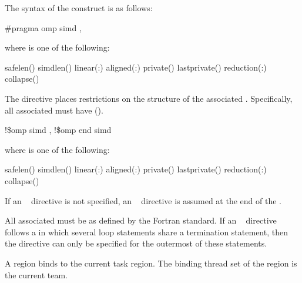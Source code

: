 \syntax
The syntax of the  construct is as follows:

\ccppspecificstart
\begin{boxedcode}
\#pragma omp simd \plc{[clause[ [},\plc{] clause] ... ] new-line}
\end{boxedcode}

where  is one of the following:

\begin{indentedcodelist}
safelen()
simdlen()
linear(\plc{list[ }:\plc{ linear-step]})
aligned(\plc{list[ }:\plc{ alignment]})
private()
lastprivate()
reduction(:)
collapse()
\end{indentedcodelist}

The  directive places restrictions on the structure of the associated . 
Specifically, all associated  must have  
().
\ccppspecificend

\fortranspecificstart
\begin{boxedcode}
!\$omp simd \plc{[clause[ [},\plc{] clause ... ]}
\plc{[}!\$omp end simd\plc{]}
\end{boxedcode}

where  is one of the following:

\begin{indentedcodelist}
safelen()
simdlen()
linear(\plc{list[ }:\plc{ linear-step]})
aligned(\plc{list[ }:\plc{ alignment]})
private()
lastprivate()
reduction(:)
collapse()
\end{indentedcodelist}

If an ~ directive is not specified, an ~ directive is assumed at the end 
of the .

All associated  must be  as defined by the Fortran standard. If an 
~ directive follows a  in which several loop statements share a  
termination statement, then the directive can only be specified for the outermost of these 
 statements. 
\fortranspecificend

\binding
A  region binds to the current task region. The binding thread set of the  
region is the current team.


